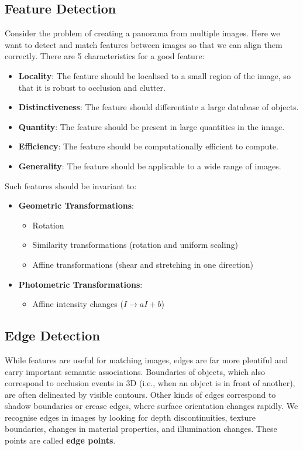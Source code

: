 \documentclass{article}
\begin{document}
\subsection{Feature Detection}
Consider the problem of creating a panorama from multiple images. Here
we want to detect and match features between images so that we can
align them correctly. There are 5 characteristics for a good feature:
\begin{itemize}
    \item \textbf{Locality}: The feature should be localised to a small
          region of the image, so that it is robust to occlusion and
          clutter.
    \item \textbf{Distinctiveness}: The feature should differentiate a
          large database of objects.
    \item \textbf{Quantity}: The feature should be present in large
          quantities in the image.
    \item \textbf{Efficiency}: The feature should be computationally
          efficient to compute.
    \item \textbf{Generality}: The feature should be applicable to a
          wide range of images.
\end{itemize}
Such features should be invariant to:
\begin{itemize}
    \item \textbf{Geometric Transformations}:
          \begin{itemize}
              \item Rotation
              \item Similarity transformations (rotation and uniform
                    scaling)
              \item Affine transformations (shear and stretching in one
                    direction)
          \end{itemize}
    \item \textbf{Photometric Transformations}:
          \begin{itemize}
              \item Affine intensity changes (\(I \to aI + b\))
          \end{itemize}
\end{itemize}
\subsection{Edge Detection}
While features are useful for matching images, edges are far more
plentiful and carry important semantic associations. Boundaries of
objects, which also correspond to occlusion events in 3D (i.e., when an
object is in front of another), are often delineated by visible
contours. Other kinds of edges correspond to shadow boundaries or
crease edges, where surface orientation changes rapidly. We recognise
edges in images by looking for depth discontinuities, texture
boundaries, changes in material properties, and illumination changes.
These points are called \textbf{edge points}.
\end{document}
